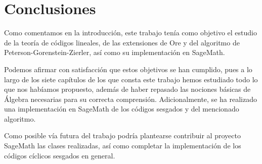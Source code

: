 \chapter*{Conclusiones}

Como comentamos en la introducción, este trabajo tenía como objetivo el estudio de la teoría de códigos lineales, de las extensiones de Ore y del algoritmo de Peterson-Gorenstein-Zierler, así como su implementación en SageMath.

Podemos afirmar con satisfacción que estos objetivos se han cumplido, pues a lo largo de los siete capítulos de los que consta este trabajo hemos estudiado todo lo que nos habíamos propuesto, además de haber repasado las nociones básicas de Álgebra necesarias para su correcta comprensión.
Adicionalmente, se ha realizado una implementación en SageMath de los códigos  sesgados y del mencionado algoritmo.

Como posible vía futura del trabajo podría plantearse contribuir al proyecto SageMath las clases realizadas, así como completar la implementación de los códigos cíclicos sesgados en general.